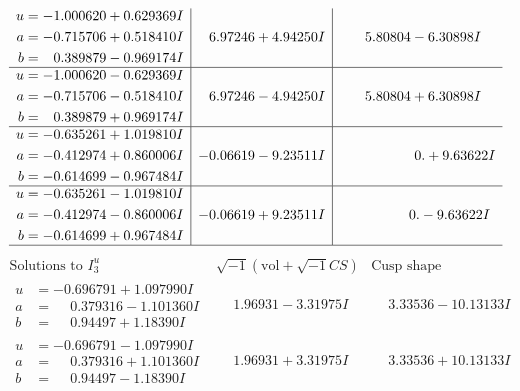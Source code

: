 \documentclass[1p]{elsarticle_modified}
\theoremstyle{definition}
\newcommand{\I}{\sqrt{-1}}
\begin{document}
$$\begin{array}{c|c|c}
\begin{aligned}
u &= -1.000620 + 0.629369 I \\
a &= -0.715706 + 0.518410 I \\
b &= \phantom{-}0.389879 - 0.969174 I\end{aligned}
 & \phantom{-}6.97246 + 4.94250 I & \phantom{-}5.80804 - 6.30898 I \\ \hline\begin{aligned}
u &= -1.000620 - 0.629369 I \\
a &= -0.715706 - 0.518410 I \\
b &= \phantom{-}0.389879 + 0.969174 I\end{aligned}
 & \phantom{-}6.97246 - 4.94250 I & \phantom{-}5.80804 + 6.30898 I \\ \hline\begin{aligned}
u &= -0.635261 + 1.019810 I \\
a &= -0.412974 + 0.860006 I \\
b &= -0.614699 - 0.967484 I\end{aligned}
 & -0.06619 - 9.23511 I & \phantom{-0.000000 -}0. + 9.63622 I \\ \hline\begin{aligned}
u &= -0.635261 - 1.019810 I \\
a &= -0.412974 - 0.860006 I \\
b &= -0.614699 + 0.967484 I\end{aligned}
 & -0.06619 + 9.23511 I & \phantom{-0.000000 } 0. - 9.63622 I\\
 \hline 
 \end{array}$$\newpage$$\begin{array}{c|c|c}  
\text{Solutions to }I^u_{3}& \I (\text{vol} + \sqrt{-1}CS) & \text{Cusp shape}\\
 \hline 
\begin{aligned}
u &= -0.696791 + 1.097990 I \\
a &= \phantom{-}0.379316 - 1.101360 I \\
b &= \phantom{-}0.94497 + 1.18390 I\end{aligned}
 & \phantom{-}1.96931 - 3.31975 I & \phantom{-}3.33536 - 10.13133 I \\ \hline\begin{aligned}
u &= -0.696791 - 1.097990 I \\
a &= \phantom{-}0.379316 + 1.101360 I \\
b &= \phantom{-}0.94497 - 1.18390 I\end{aligned}
 & \phantom{-}1.96931 + 3.31975 I & \phantom{-}3.33536 + 10.13133 I \\ \hline\begin{aligned}

\end{aligned}
\end{array}$$
\end{document}
